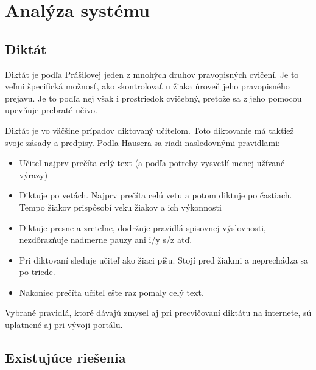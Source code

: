 \documentclass[12pt,oneside]{fithesis2}
\begin{document}
    \chapter{Analýza systému}
       \section{Diktát}
	\par Diktát je podľa Prášilovej\cite{prasilova14} jeden z mnohých druhov pravopisných cvičení. Je to veľmi špecifická možnosť, ako skontrolovať u žiaka úroveň jeho pravopisného prejavu. Je to podľa nej však i prostriedok cvičebný, pretože sa z jeho pomocou upevňuje prebraté učivo. 
	\par Diktát je vo väčšine prípadov diktovaný učiteľom. Toto diktovanie má taktiež svoje zásady a predpisy. Podľa Hausera\cite{hauser94} sa riadi nasledovnými pravidlami:
	      \begin{itemize}
	\item Učiteľ najprv prečíta celý text (a podľa potreby vysvetlí menej užívané výrazy)
	\item Diktuje po vetách. Najprv prečíta celú vetu a potom diktuje po častiach. Tempo žiakov prispôsobí veku žiakov a ich výkonnosti
	\item Diktuje presne a zreteľne, dodržuje pravidlá spisovnej výslovnosti, nezdôrazňuje nadmerne pauzy ani i/y s/z atď.
	\item Pri diktovaní sleduje učiteľ ako žiaci píšu. Stojí pred žiakmi a neprechádza sa po triede.
	\item Nakoniec prečíta učiteľ ešte raz pomaly celý text.
\end{itemize}

\par Vybrané pravidlá, ktoré dávajú zmysel aj pri precvičovaní diktátu na internete, sú uplatnené aj pri vývoji portálu.
	

       \section{Existujúce riešenia}       
\end{document}
